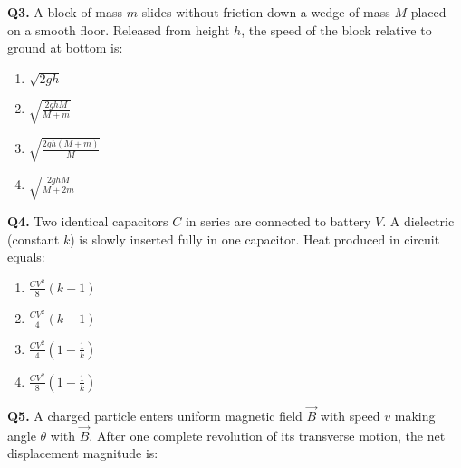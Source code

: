 \documentclass[12pt]{article}
\begin{document}
\textbf{Q3.}  
A block of mass $m$ slides without friction down a wedge of mass $M$ placed on a smooth floor.  
Released from height $h$, the speed of the block relative to ground at bottom is:

\begin{center}
\end{center}

\begin{enumerate}[label=(\Alph*)]
\item $\displaystyle \sqrt{2gh}$
\item $\displaystyle \sqrt{\frac{2ghM}{M+m}}$
\item $\displaystyle \sqrt{\frac{2gh(M+m)}{M}}$
\item $\displaystyle \sqrt{\frac{2ghM}{M+2m}}$
\end{enumerate}

\textbf{Q4.}  
Two identical capacitors $C$ in series are connected to battery $V$.  
A dielectric (constant $k$) is slowly inserted fully in one capacitor.  
Heat produced in circuit equals:

\begin{enumerate}[label=(\Alph*)]
\item $\displaystyle \frac{CV^2}{8}(k-1)$
\item $\displaystyle \frac{CV^2}{4}(k-1)$
\item $\displaystyle \frac{CV^2}{4}\!\left(1-\frac{1}{k}\right)$
\item $\displaystyle \frac{CV^2}{8}\!\left(1-\frac{1}{k}\right)$
\end{enumerate}

\textbf{Q5.}  
A charged particle enters uniform magnetic field $\vec B$ with speed $v$ making angle $\theta$ with $\vec B$.  
After one complete revolution of its transverse motion, the net displacement magnitude is:

\begin{center}
\end{center}
\end{document}
